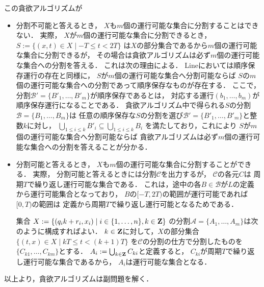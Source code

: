 この貪欲アルゴリズムが
\begin{itemize}
  \item 分割不可能と答えるとき，
    $X$も$m$個の運行可能な集合に分割することはできない．
    実際，
    $X$が$m$個の運行可能な集合に分割できるとき，
    $S := \{ (x, t) \in X \mid -T \leq t < 2T \}$
    は$X$の部分集合であるから$m$個の運行可能な集合に分割できるが，
    その場合は貪欲アルゴリズムは必ず$m$個の運行可能な集合への分割を答える．
    これは次の理由による．
    Lineにおいては順序保存運行の存在と同様に，
    $S$が$m$個の運行可能な集合へ分割可能ならば
    $S$の$m$個の運行可能な集合への分割であって順序保存なものが存在する．
    ここで，分割$\mathcal{B'} = \{ B'_1, \ldots, B'_m \}$が順序保存であるとは，
    対応する運行$(b_1, \ldots, b_m)$が順序保存運行になることである．
    貪欲アルゴリズム中で得られる$S$の分割$\mathcal{B} = \{ B_1, \ldots, B_m \}$は
    任意の順序保存な$S$の分割を選び$\mathcal{B'} = \{ B'_1, \ldots, B'_m \}$と整数$k$に対し，
    $\bigcup_{1 \leq i \leq k} B'_i \subseteq \bigcup_{1 \leq i \leq k} B_i$
    を満たしており，これにより
    $S$が$m$個の運行可能な集合へ分割可能ならば
    貪欲アルゴリズムは必ず$m$個の運行可能な集合への分割を答えることが分かる．
  \item 分割可能と答えるとき，
    $X$も$m$個の運行可能な集合に分割することができる．
    実際，
    分割可能と答えるときには分割$\mathcal{C}$を出力するが，
    $\mathcal{C}$の各元$C$は
    周期$T$で繰り返し運行可能な集合である．
    これは，途中の各$B \in \mathcal{B}$が$L$の定義から運行可能集合となっており，
    $B$の$[-T, 2T)$の範囲が運行可能であれば$[0, T)$の範囲は
    定義から周期$T$で繰り返し運行可能となるためである．

    集合
    $X := \{ (q_i k + r_i, x_i) \mid i \in \{1, \ldots, n\}, k \in \mathbf Z \}$
    の分割$\mathcal{A} = \{ A_1, \ldots, A_m \}$は次のように構成すればよい．
    $k \in \mathbf Z$に対して，$X$の部分集合
    $\{ (t, x) \in X \mid kT \leq t < (k + 1)T \}$
    を$\mathcal{C}$の分割の仕方で分割したものを$\{ C_{k1}, \ldots, C_{km} \}$とする．
    $A_i := \bigcup_{k \in \mathbf Z} C_{ki}$と定義すると，
    $C_{ki}$が周期$T$で繰り返し運行可能な集合であるから，
    $A_i$は運行可能な集合となる．
\end{itemize}
以上より，貪欲アルゴリズムは副問題を解く．





